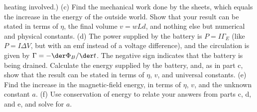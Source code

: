         heating involved.)\answercheck\hwendpart
        (c) Find the mechanical work done by the sheets,
        which equals the increase in the energy of the outside world. Show that your
        result can be stated in terms of $\eta$, the final volume $v=wLd$, and nothing
        else but numerical and physical constants.\answercheck\hwendpart
        (d) The power supplied by the battery is $P=I\Gamma_E$ (like $P=I\Delta V$, but
        with an emf instead of a voltage difference), and the circulation is given
        by $\Gamma=-\der\Phi_B/\der t$. The negative sign indicates that the battery is
        being drained. Calculate the energy supplied by the battery, and, as in part c,
        show that the result can be stated in terms of $\eta$, $v$, and 
        universal constants.\answercheck\hwendpart
        (e) Find the increase in the magnetic-field energy, in terms of
        $\eta$, $v$, and the unknown constant $a$.\answercheck\hwendpart
        (f) Use conservation of energy to relate your answers from parts c, d, and e,
        and solve for $a$.\answercheck        
